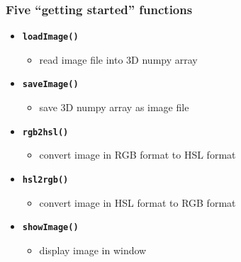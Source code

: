 \documentclass[english,14pt]{beamer}
\newcommand\blue[1]{{\color{blue} #1}}
\begin{document}

\begin{frame}[fragile]

\frametitle{Five ``getting started'' functions}

\begin{itemize}
	\item \textbf{\blue{\texttt{loadImage()}}}
	\begin{itemize}
		\item read image file into 3D numpy array
	\end{itemize}
		
	\item \textbf{\blue{\texttt{saveImage()}}}
	\begin{itemize}
		\item save 3D numpy array as image file
	\end{itemize}
			
	\item \textbf{\blue{\texttt{rgb2hsl()}}}
	\begin{itemize}
		\item convert image in RGB format to HSL format
	\end{itemize}
			
	\item \textbf{\blue{\texttt{hsl2rgb()}}}
	\begin{itemize}
		\item convert image in HSL format to RGB format
	\end{itemize}
			
	\item \textbf{\blue{\texttt{showImage()}}}
	\begin{itemize}
		\item display image in window
	\end{itemize}
\end{itemize}

\end{frame}

\end{document}
